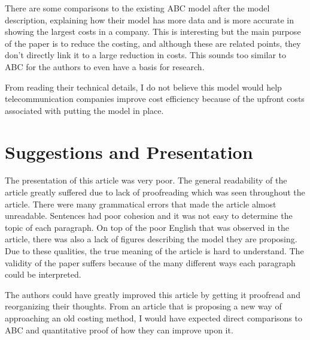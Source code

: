 \documentclass[10pt,]{article}
\begin{document}
There are some comparisons to the existing ABC model after the model
description, explaining how their model has more data and is more
accurate in showing the largest costs in a company. This is interesting
but the main purpose of the paper is to reduce the costing, and although
these are related points, they don't directly link it to a large
reduction in costs. This sounds too similar to ABC for the authors to
even have a basis for research.

From reading their technical details, I do not believe this model would
help telecommunication companies improve cost efficiency because of the
upfront costs associated with putting the model in place.

\section{Suggestions and
Presentation}\label{suggestions-and-presentation}

The presentation of this article was very poor. The general readability
of the article greatly suffered due to lack of proofreading which was
seen throughout the article. There were many grammatical errors that
made the article almost unreadable. Sentences had poor cohesion and it
was not easy to determine the topic of each paragraph. On top of the
poor English that was observed in the article, there was also a lack of
figures describing the model they are proposing. Due to these qualities,
the true meaning of the article is hard to understand. The validity of
the paper suffers because of the many different ways each paragraph
could be interpreted.

The authors could have greatly improved this article by getting it
proofread and reorganizing their thoughts. From an article that is
proposing a new way of approaching an old costing method, I would have
expected direct comparisons to ABC and quantitative proof of how they
can improve upon it.


\end{document}
